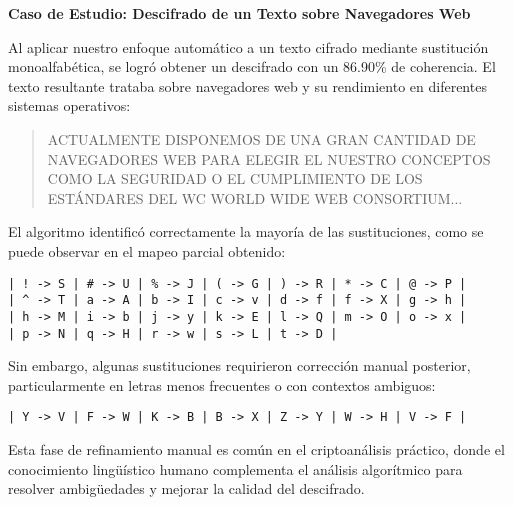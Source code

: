 \begin{securitygoodpractice}
\textbf{Caso de Estudio: Descifrado de un Texto sobre Navegadores Web}

Al aplicar nuestro enfoque automático a un texto cifrado mediante sustitución monoalfabética, se logró obtener un descifrado con un 86.90\% de coherencia. El texto resultante trataba sobre navegadores web y su rendimiento en diferentes sistemas operativos:

\begin{quote}
ACTUALMENTE DISPONEMOS DE UNA GRAN CANTIDAD DE NAVEGADORES WEB PARA ELEGIR EL NUESTRO CONCEPTOS COMO LA SEGURIDAD O EL CUMPLIMIENTO DE LOS ESTÁNDARES DEL WC WORLD WIDE WEB CONSORTIUM...
\end{quote}

El algoritmo identificó correctamente la mayoría de las sustituciones, como se puede observar en el mapeo parcial obtenido:
\begin{verbatim}
| ! -> S | # -> U | % -> J | ( -> G | ) -> R | * -> C | @ -> P |
| ^ -> T | a -> A | b -> I | c -> v | d -> f | f -> X | g -> h |
| h -> M | i -> b | j -> y | k -> E | l -> Q | m -> O | o -> x |
| p -> N | q -> H | r -> w | s -> L | t -> D |
\end{verbatim}

Sin embargo, algunas sustituciones requirieron corrección manual posterior, particularmente en letras menos frecuentes o con contextos ambiguos:
\begin{verbatim}
| Y -> V | F -> W | K -> B | B -> X | Z -> Y | W -> H | V -> F |
\end{verbatim}

Esta fase de refinamiento manual es común en el criptoanálisis práctico, donde el conocimiento lingüístico humano complementa el análisis algorítmico para resolver ambigüedades y mejorar la calidad del descifrado.
\end{securitygoodpractice}

